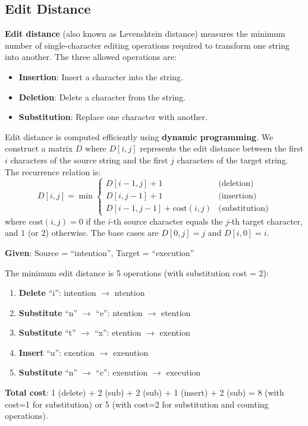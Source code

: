\documentclass[11pt,a4paper]{article}
\begin{document}
\subsection{Edit Distance}

\textbf{Edit distance} (also known as Levenshtein distance) measures the minimum number of single-character editing operations required to transform one string into another. The three allowed operations are:
\begin{itemize}
    \item \textbf{Insertion}: Insert a character into the string.
    \item \textbf{Deletion}: Delete a character from the string.
    \item \textbf{Substitution}: Replace one character with another.
\end{itemize}

Edit distance is computed efficiently using \textbf{dynamic programming}. We construct a matrix $D$ where $D[i, j]$ represents the edit distance between the first $i$ characters of the source string and the first $j$ characters of the target string. The recurrence relation is:
\[
D[i, j] = \min\begin{cases}
D[i-1, j] + 1 & \text{(deletion)} \\
D[i, j-1] + 1 & \text{(insertion)} \\
D[i-1, j-1] + \text{cost}(i,j) & \text{(substitution)}
\end{cases}
\]
where $\text{cost}(i,j) = 0$ if the $i$-th source character equals the $j$-th target character, and $1$ (or $2$) otherwise. The base cases are $D[0, j] = j$ and $D[i, 0] = i$.

\begin{tcolorbox}[colback=green!5!white,colframe=green!75!black,title=\textbf{Numerical: Edit Distance Example}]
\textbf{Given}: Source = ``intention'', Target = ``execution''

The minimum edit distance is 5 operations (with substitution cost = 2):
\begin{enumerate}
    \item \textbf{Delete} ``i'': intention $\to$ ntention
    \item \textbf{Substitute} ``n'' $\to$ ``e'': ntention $\to$ etention
    \item \textbf{Substitute} ``t'' $\to$ ``x'': etention $\to$ exention
    \item \textbf{Insert} ``u'': exention $\to$ exenution
    \item \textbf{Substitute} ``n'' $\to$ ``c'': exenution $\to$ execution
\end{enumerate}
\textbf{Total cost}: 1 (delete) + 2 (sub) + 2 (sub) + 1 (insert) + 2 (sub) = 8 (with cost=1 for substitution) or 5 (with cost=2 for substitution and counting operations).
\end{tcolorbox}
\end{document}
